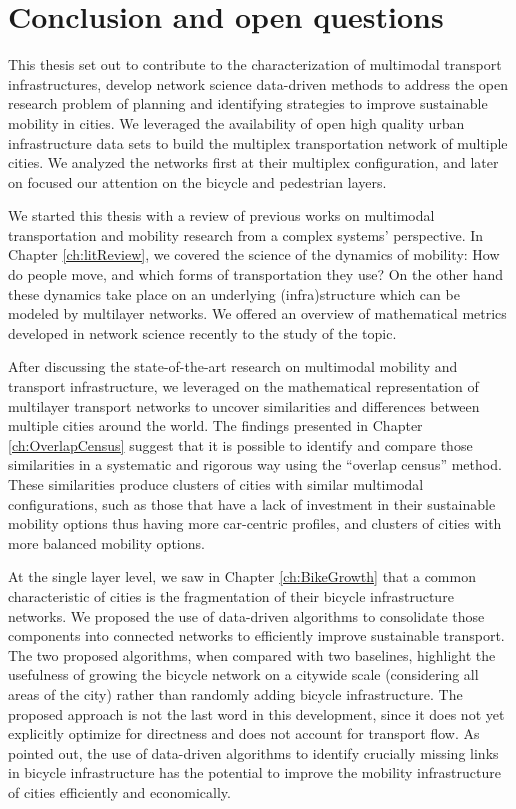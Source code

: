 \chapter{Conclusion and open questions}\label{ch:Conclusion}

This thesis set out to contribute to the characterization of multimodal transport infrastructures, develop network science data-driven methods to address the open research problem of planning and identifying strategies to improve sustainable mobility in cities. We leveraged the availability of open high quality urban infrastructure data sets to build the multiplex transportation network of multiple cities. We analyzed the networks first at their multiplex configuration, and later on focused our attention on the bicycle and pedestrian layers.

We started this thesis with a review of previous works on multimodal transportation and mobility research from a complex systems' perspective. In Chapter \ref{ch:litReview}, we covered the science of the dynamics of mobility: How do people move, and which forms of transportation they use? On the other hand these dynamics take place on an underlying (infra)structure which can be modeled by multilayer networks. We offered an overview of mathematical metrics developed in network science recently to the study of the topic. 

After discussing the state-of-the-art research on multimodal mobility and transport infrastructure, we leveraged on the mathematical representation of multilayer transport networks to uncover similarities and differences between multiple cities around the world. The findings presented in Chapter \ref{ch:OverlapCensus} suggest that it is possible to identify and compare those similarities in a systematic and rigorous way using the ``overlap census'' method. These similarities produce clusters of cities with similar multimodal configurations, such as those that have a lack of investment in their sustainable mobility options thus having more car-centric profiles, and clusters of cities with more balanced mobility options.

At the single layer level, we saw in Chapter \ref{ch:BikeGrowth} that a common characteristic of cities is the fragmentation of their bicycle infrastructure networks. We proposed the use of data-driven algorithms to consolidate those components into connected networks to efficiently improve sustainable transport. The two proposed algorithms, when compared with two baselines, highlight the usefulness of growing the bicycle network on a citywide scale (considering all areas of the city) rather than randomly adding bicycle infrastructure. The proposed approach is not the last word in this development, since it does not yet explicitly optimize for directness and does not account for transport flow. As pointed out, the use of data-driven algorithms to identify crucially missing links in bicycle infrastructure has the potential to improve the mobility infrastructure of cities efficiently and economically.

